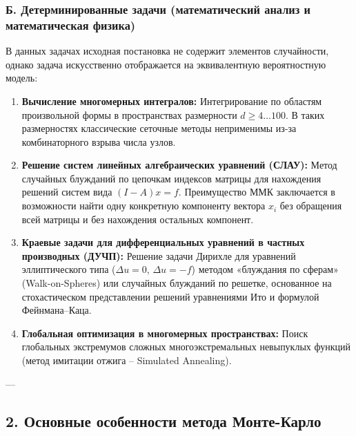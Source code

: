 \documentclass[11pt,a4paper]{article}
\begin{document}
\subsubsection{Б. Детерминированные задачи (математический анализ и математическая физика)}
В данных задачах исходная постановка не содержит элементов случайности, однако задача искусственно отображается на эквивалентную вероятностную модель:
\begin{enumerate}
    \item \textbf{Вычисление многомерных интегралов:} Интегрирование по областям произвольной формы в пространствах размерности $d \ge 4 \dots 100$. В таких размерностях классические сеточные методы неприменимы из-за комбинаторного взрыва числа узлов.
    \item \textbf{Решение систем линейных алгебраических уравнений (СЛАУ):} Метод случайных блужданий по цепочкам индексов матрицы для нахождения решений систем вида $(I - A)x = f$. Преимущество ММК заключается в возможности найти одну конкретную компоненту вектора $x_i$ без обращения всей матрицы и без нахождения остальных компонент.
    \item \textbf{Краевые задачи для дифференциальных уравнений в частных производных (ДУЧП):} Решение задачи Дирихле для уравнений эллиптического типа ($\Delta u = 0$, $\Delta u = -f$) методом «блуждания по сферам» (Walk-on-Spheres) или случайных блужданий по решетке, основанное на стохастическом представлении решений уравнениями Ито и формулой Фейнмана--Каца.
    \item \textbf{Глобальная оптимизация в многомерных пространствах:} Поиск глобальных экстремумов сложных многоэкстремальных невыпуклых функций (метод имитации отжига -- Simulated Annealing).
\end{enumerate}

---

\subsection{2. Основные особенности метода Монте-Карло}
\end{document}
